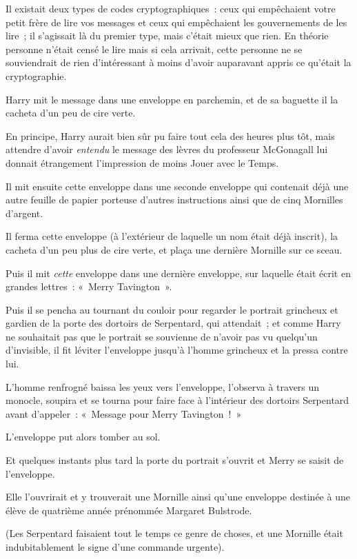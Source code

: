 Il existait deux types de codes cryptographiques~: ceux qui empêchaient votre petit frère de lire vos messages et ceux qui empêchaient les gouvernements de les lire~; il s'agissait là du premier type, mais c'était mieux que rien. En théorie personne n'était censé le lire mais si cela arrivait, cette personne ne se souviendrait de rien d'intéressant à moins d'avoir auparavant appris ce qu'était la cryptographie.

Harry mit le message dans une enveloppe en parchemin, et de sa baguette il la cacheta d'un peu de cire verte.

En principe, Harry aurait bien sûr pu faire tout cela des heures plus tôt, mais attendre d'avoir \emph{entendu} le message des lèvres du professeur McGonagall lui donnait étrangement l'impression de moins Jouer avec le Temps.

Il mit ensuite cette enveloppe dans une seconde enveloppe qui contenait déjà une autre feuille de papier porteuse d'autres instructions ainsi que de cinq Mornilles d'argent.

Il ferma cette enveloppe (à l'extérieur de laquelle un nom était déjà inscrit), la cacheta d'un peu plus de cire verte, et plaça une dernière Mornille sur ce sceau.

Puis il mit \emph{cette} enveloppe dans une dernière enveloppe, sur laquelle était écrit en grandes lettres~: «~Merry Tavington~».

Puis il se pencha au tournant du couloir pour regarder le portrait grincheux et gardien de la porte des dortoirs de Serpentard, qui attendait~; et comme Harry ne souhaitait pas que le portrait se souvienne de n'avoir pas vu quelqu'un d'invisible, il fit léviter l'enveloppe jusqu'à l'homme grincheux et la pressa contre lui.

L'homme renfrogné baissa les yeux vers l'enveloppe, l'observa à travers un monocle, soupira et se tourna pour faire face à l'intérieur des dortoirs Serpentard avant d'appeler~: «~Message pour Merry Tavington~!~»

L'enveloppe put alors tomber au sol.

Et quelques instants plus tard la porte du portrait s'ouvrit et Merry se saisit de l'enveloppe.

Elle l'ouvrirait et y trouverait une Mornille ainsi qu'une enveloppe destinée à une élève de quatrième année prénommée Margaret Bulstrode.

(Les Serpentard faisaient tout le temps ce genre de choses, et une Mornille était indubitablement le signe d'une commande urgente).

